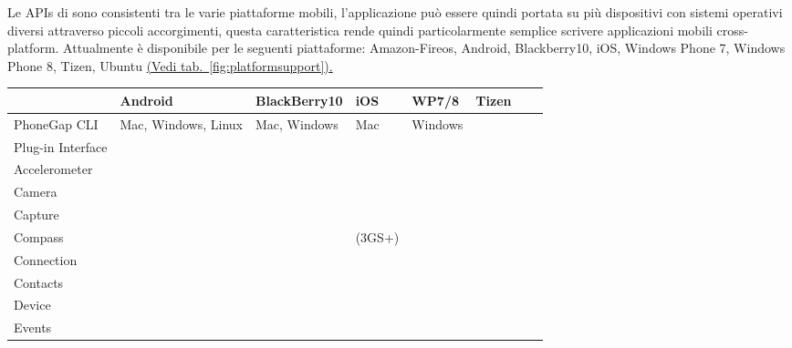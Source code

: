             Le APIs di \pg{} sono consistenti tra le varie piattaforme mobili,
            l'applicazione può essere quindi portata su più dispositivi con
            sistemi operativi diversi attraverso piccoli accorgimenti, questa
            caratteristica rende quindi particolarmente semplice scrivere
            applicazioni mobili cross-platform.
            Attualmente \pg{} è disponibile per le seguenti piattaforme:
            Amazon-Fireos, Android, Blackberry10, iOS, Windows Phone 7,
            Windows Phone 8, Tizen, Ubuntu \hyperref[fig:platformsupport]{(Vedi
            tab.~\ref{fig:platformsupport}).}
            {\footnotesize
                \begin{table}
                    \begin{tabularx}{\textwidth}{|l*{7}{|s}|}
                        \hline
                          & Android & Black\-Berry10 & iOS & WP7/8
                        & Tizen
                        \tabularnewline
                        \hline
                        PhoneGap CLI &\sprt{} Mac, Windows, Linux &
                        \sprt{} Mac, Windows & \sprt{} Mac & \sprt{} Windows & \notsprt{}
                        \tabularnewline
                        \hline
                        Plug-in Interface & \sprt{} & \sprt{} & \sprt{} & \sprt{} &
                        \notsprt{}
                        \tabularnewline
                        \hline
                        Accelerometer & \sprt{} & \sprt{} & \sprt{} & \sprt{} & \sprt{}
                        \tabularnewline
                        \hline
                        Camera & \sprt{} & \sprt{} & \sprt{} & \sprt{} & \sprt{}
                        \tabularnewline
                        \hline
                        Capture & \sprt{} & \sprt{} & \sprt{} & \sprt{} & \notsprt{}
                        \tabularnewline
                        \hline
                        Compass & \sprt{} & \sprt{} & \sprt{} (3GS+)& \sprt{} & \sprt{}
                        \tabularnewline
                        \hline
                        Connection & \sprt{} & \sprt{} & \sprt{} & \sprt{} & \sprt{}
                        \tabularnewline
                        \hline
                        Contacts & \sprt{} & \sprt{} & \sprt{} & \sprt{} & \notsprt{}
                        \tabularnewline
                        \hline
                        Device & \sprt{} & \sprt{} & \sprt{} & \sprt{} & \sprt{}
                        \tabularnewline
                        \hline
                        Events & \sprt{} & \sprt{} & \sprt{} & \sprt{} & \sprt{}

\end{tabularx}
\end{table}}
